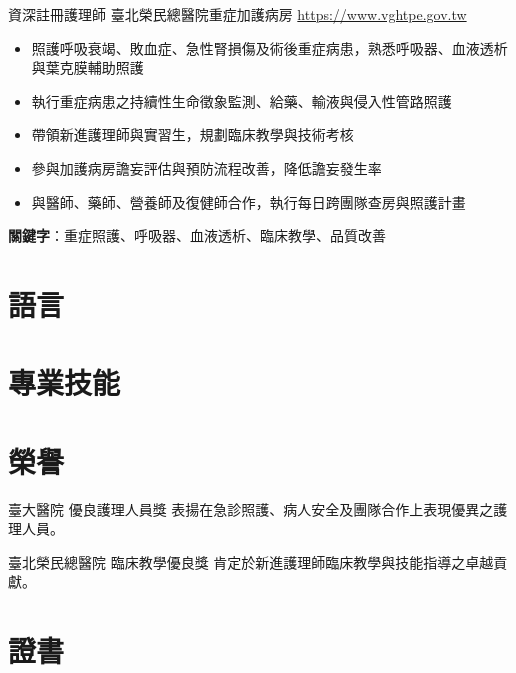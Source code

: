 \documentclass[a4paper, serif, 10pt]{moderncv}
\begin{document}
        {資深註冊護理師}
        {臺北榮民總醫院重症加護病房}
        {\url{https://www.vghtpe.gov.tw}}
        {}
        {\begin{itemize}
\item 照護呼吸衰竭、敗血症、急性腎損傷及術後重症病患，熟悉呼吸器、血液透析與葉克膜輔助照護
\item 執行重症病患之持續性生命徵象監測、給藥、輸液與侵入性管路照護
\item 帶領新進護理師與實習生，規劃臨床教學與技術考核
\item 參與加護病房譫妄評估與預防流程改善，降低譫妄發生率
\item 與醫師、藥師、營養師及復健師合作，執行每日跨團隊查房與照護計畫
\end{itemize}
\textbf{關鍵字}：重症照護、呼吸器、血液透析、臨床教學、品質改善}
\section{語言}

\section{專業技能}

\section{榮譽}

        {臺大醫院}
        {優良護理人員獎}
        {}
        {}
        {表揚在急診照護、病人安全及團隊合作上表現優異之護理人員。}

        {臺北榮民總醫院}
        {臨床教學優良獎}
        {}
        {}
        {肯定於新進護理師臨床教學與技能指導之卓越貢獻。}
\section{證書}
\end{document}
